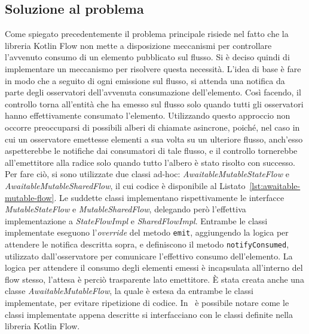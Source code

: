 \documentclass[12pt,a4paper,openright,twoside]{book}
\begin{document}
\subsection{Soluzione al problema}
Come spiegato precedentemente il problema principale risiede nel fatto che la libreria Kotlin Flow non mette a disposizione meccanismi per controllare l'avvenuto consumo di un elemento pubblicato sul flusso. Si è deciso quindi di implementare un meccanismo per risolvere questa necessità. 
L'idea di base è fare in modo che a seguito di ogni emissione sul flusso, si attenda una notifica da parte degli osservatori dell'avvenuta consumazione dell'elemento. Così facendo, il controllo torna all'entità che ha emesso sul flusso solo quando tutti gli osservatori hanno effettivamente consumato l'elemento. Utilizzando questo approccio non occorre preoccuparsi di possibili alberi di chiamate asincrone, poiché, nel caso in cui un osservatore emettesse elementi a sua volta su un ulteriore flusso, anch'esso aspetterebbe le notifiche dai consumatori di tale flusso, e il controllo tornerebbe all'emettitore alla radice solo quando tutto l'albero è stato risolto con successo.
Per fare ciò, si sono utilizzate due classi ad-hoc: \textit{AwaitableMutableStateFlow} e \textit{AwaitableMutableSharedFlow}, il cui codice è disponibile al Listato~\ref{lst:awaitable-mutable-flow}. Le suddette classi implementano rispettivamente le interfacce \textit{MutableStateFlow} e \textit{MutableSharedFlow}, delegando però l'effettiva implementazione a \textit{StateFlowImpl} e \textit{SharedFlowImpl}. Entrambe le classi implementate eseguono l'\textit{override} del metodo \texttt{emit}, aggiungendo la logica per attendere le notifica descritta sopra, e definiscono il metodo \texttt{notifyConsumed}, utilizzato dall'osservatore per comunicare l'effettivo consumo dell'elemento. La logica per attendere il consumo degli elementi emessi è incapsulata all'interno del flow stesso, l'attesa è perciò trasparente lato emettitore. È stata creata anche una classe \textit{AwaitableMutableFlow}, la quale è estesa da entrambe le classi implementate, per evitare ripetizione di codice. 
In~ è possibile notare come le classi implementate appena descritte si interfacciano con le classi definite nella libreria Kotlin Flow. 
\end{document}
